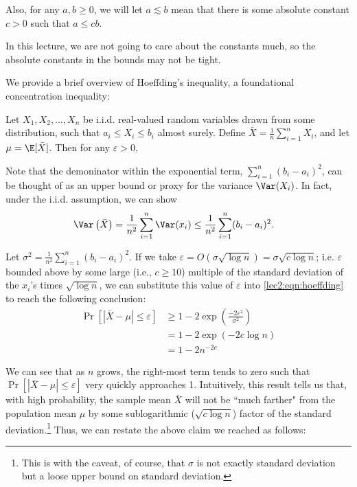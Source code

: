 Also, for any $a, b \geq 0$, we will let $a \lesssim b$ mean that there is some absolute constant $c > 0$ such that $a \leq cb$.

In this lecture, we are not going to care about the constants much, so the absolute constants in the bounds may not be tight.

\label{lec2:subsec:hoeffding}

We provide a brief overview of Hoeffding's inequality, a foundational concentration inequality:

\begin{theorem}
    Let $X_1, X_2, \dots, X_n$ be i.i.d. real-valued random variables drawn from some distribution, such that $a_i \leq X_i \leq b_i$ almost surely. Define $\bar{X} = \frac{1}{n}\sum_{i=1}^n X_i$, and let $\mu = \E [\bar{X}]$. Then for any $\varepsilon > 0$,
\end{theorem}

Note that the demoninator within the exponential term, $\sum_{i=1}^n (b_i - a_i)^2$, can be thought of as an upper bound or proxy for the variance $\Var(X_i)$. In fact, under the i.i.d. assumption, we can show
\begin{align}
    \Var\left(\bar{X} \right) &= \frac{1}{n^2}\sum_{i=1}^n \Var(x_i) \leq \frac{1}{n^2}\sum_{i=1}^n (b_i - a_i)^2.
\end{align}

Let $\sigma^2 = \frac{1}{n^2}\sum_{i=1}^n (b_i - a_i)^2$. If we take $\varepsilon = O(\sigma \sqrt{\log{n}}) = \sigma \sqrt{c \log n}$; i.e. $\varepsilon$ bounded above by some large (i.e., $c \geq 10$) multiple of the standard deviation of the $x_i$'s times $\sqrt{\log{n}}$, we can substitute this value of $\varepsilon$ into \eqref{lec2:eqn:hoeffding} to reach the following conclusion: 
\begin{align}
    \Pr \left[ |\bar{X} - \mu| \leq \varepsilon \right] &\geq 1 - 2\exp\left(\frac{-2 \varepsilon^2}{\sigma^2}\right)\\
    &= 1 - 2 \exp(-2 c \log n)\\
    &= 1 - 2 n^{-2c}
\end{align}

We can see that as $n$ grows, the right-most term tends to zero such that $\Pr[|\bar{X} - \mu| \leq \varepsilon]$ very quickly approaches 1. Intuitively, this result tells us that, with high probability, the sample mean $\bar{X}$ will not be ``much farther" from the population mean $\mu$ by some sublogarithmic ($\sqrt{c \log n}$) factor of the standard deviation.\footnote{This is with the caveat, of course, that $\sigma$ is not exactly standard deviation but a loose upper bound on standard deviation.} Thus, we can restate the above claim we reached as follows:

